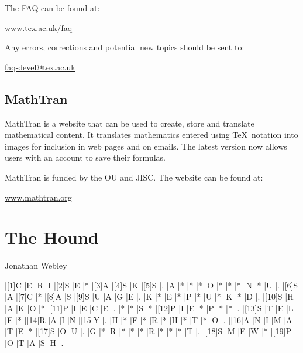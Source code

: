 \documentclass[a4paper,twoside,twocolumn]{article}
\newcommand{\AUTHOR}[1]
{
\textsf{#1} \vspace{1em}
}
\begin{document}
The FAQ can be found at:
\begin{center}
\href{http://www.tex.ac.uk/faq}{www.tex.ac.uk/faq}
\end{center}

Any errors, corrections and potential new topics should be sent to:
\begin{center}
\href{mailto:faq-devel@tex.ac.uk}{faq-devel@tex.ac.uk}
\end{center}


\subsection{MathTran}

MathTran is a website that can be used to create, store and translate mathematical content. It translates mathematics entered using \TeX\ notation into images for inclusion in web pages and on emails. The latest version now allows users with an account to save their formulas.

MathTran is funded by the OU and JISC. The website can be found at:
\begin{center}
\href{http://www.mathtran.org/}{www.mathtran.org}
\end{center}


\section{The Hound}

\AUTHOR{Jonathan Webley}


\begin{Puzzle}{11}{11}
|[1]C |E |R |I |[2]S |E |* |[3]A |[4]S |K |[5]S |.
|A |* |* |* |O |* |* |* |N |* |U |.
|[6]S |A |[7]C |* |[8]A |S |[9]S |U |A |G |E |.
|K |* |E |* |P |* |U |* |K |* |D |.
|[10]S |H |A |K |O |* |[11]P |I |E |C |E |.
|* |* |S |* |[12]P |I |E |* |P |* |* |.
|[13]S |T |E |L |E |* |[14]R |A |I |N |[15]Y |.
|H |* |F |* |R |* |H |* |T |* |O |.
|[16]A |N |I |M |A |T |E |* |[17]S |O |U |.
|G |* |R |* |* |* |R |* |* |* |T |.
|[18]S |M |E |W |* |[19]P |O |T |A |S |H |.
\end{Puzzle}
\end{document}
